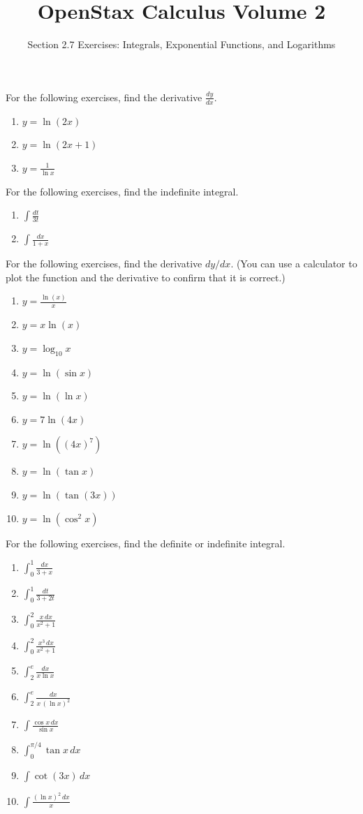 \documentclass{exercises}
\title{OpenStax Calculus Volume 2}
\subtitle{Section 2.7 Exercises: Integrals, Exponential Functions, and Logarithms}
\author{}
\date{}
\begin{document}
\maketitle


For the following exercises, find the derivative $\frac{dy}{dx}$.

\begin{enumerate}[start=1]
\item $y=\ln(2x)$
\item $y=\ln(2x+1)$
\item $y=\frac{1}{\ln x}$
\end{enumerate}

For the following exercises, find the indefinite integral.

\begin{enumerate}[resume]
\item $\int \frac{dt}{3t}$
\item $\int \frac{dx}{1+x}$
\end{enumerate}

For the following exercises, find the derivative $dy/dx$. (You can use a calculator to plot the function and the derivative to confirm that it is correct.)

\begin{enumerate}[resume]
\item \techrequired $y=\frac{\ln(x)}{x}$
\item \techrequired $y=x\ln(x)$
\item \techrequired $y=\log_{10}x$
\item \techrequired $y=\ln(\sin x)$
\item \techrequired $y=\ln(\ln x)$
\item \techrequired $y=7\ln(4x)$
\item \techrequired $y=\ln({(4x)}^{7})$
\item \techrequired $y=\ln(\tan x)$
\item \techrequired $y=\ln(\tan(3x))$
\item \techrequired $y=\ln(\cos^{2}x)$
\end{enumerate}

For the following exercises, find the definite or indefinite integral.

\begin{enumerate}[resume]
\item $\int_{0}^{1}\frac{dx}{3+x}$
\item $\int_{0}^{1}\frac{dt}{3+2t}$
\item $\int_{0}^{2}\frac{x\,dx}{x^{2}+1}$
\item $\int_{0}^{2}\frac{x^{3}\,dx}{x^{2}+1}$
\item $\int_{2}^{e}\frac{dx}{x\ln x}$
\item $\int_{2}^{e}\frac{dx}{x\,{(\ln x)}^{2}}$
\item $\int \frac{\cos x\,dx}{\sin x}$
\item $\int_{0}^{\pi/4}\tan x\,dx$
\item $\int \cot(3x)\,dx$
\item $\int \frac{{(\ln x)}^{2}\,dx}{x}$
\end{enumerate}
\end{document}
